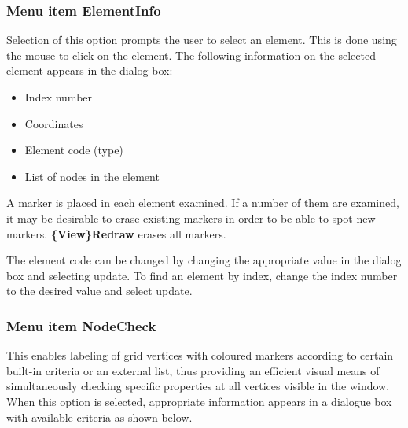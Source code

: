 \documentclass{article}
\begin{document}
\subsubsection{Menu item ElementInfo}
Selection of this option prompts the user to select an element.  This is done using the mouse to click on the element. The following information on the selected element appears in the dialog box:

\begin{itemize}
\item Index number
\item Coordinates
\item Element code (type)
\item List of nodes in the element 
\end{itemize}
A marker is placed in each element examined. If a number of them are examined, it may be desirable to erase existing markers in order to be able to spot new markers. \textbf{\{View\}Redraw} erases all markers.

The element code can be changed by changing the appropriate value in the dialog box and selecting update. To find an element by index, change the index number to the desired value and select update.

\subsubsection{Menu item NodeCheck}
This enables labeling of grid vertices with coloured markers according to certain built-in criteria or an external list, thus providing an efficient visual means of simultaneously checking specific properties at all vertices visible in the window. When this option is selected, appropriate information appears in a dialogue box with available criteria as shown below.
\end{document}
